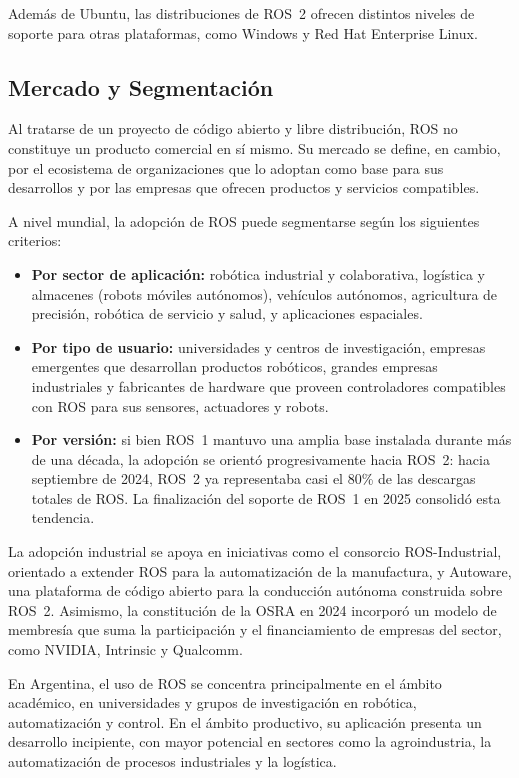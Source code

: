 Además de Ubuntu, las distribuciones de ROS~2 ofrecen distintos niveles de
soporte para otras plataformas, como Windows y Red Hat Enterprise Linux.

\subsection{Mercado y Segmentación}

Al tratarse de un proyecto de código abierto y libre distribución, ROS no
constituye un producto comercial en sí mismo. Su mercado se define, en cambio,
por el ecosistema de organizaciones que lo adoptan como base para sus
desarrollos y por las empresas que ofrecen productos y servicios compatibles.

A nivel mundial, la adopción de ROS puede segmentarse según los siguientes
criterios:
\begin{itemize}
    \item \textbf{Por sector de aplicación:} robótica industrial y
    colaborativa, logística y almacenes (robots móviles autónomos),
    vehículos autónomos, agricultura de precisión, robótica de servicio y
    salud, y aplicaciones espaciales.
    \item \textbf{Por tipo de usuario:} universidades y centros de
    investigación, empresas emergentes que desarrollan productos robóticos,
    grandes empresas industriales y fabricantes de hardware que proveen
    controladores compatibles con ROS para sus sensores, actuadores y robots.
    \item \textbf{Por versión:} si bien ROS~1 mantuvo una amplia base instalada
    durante más de una década, la adopción se orientó progresivamente hacia
    ROS~2: hacia septiembre de 2024, ROS~2 ya representaba casi el 80\% de
    las descargas totales de ROS. La finalización del soporte de ROS~1 en
    2025 consolidó esta tendencia.
\end{itemize}

La adopción industrial se apoya en iniciativas como el consorcio
ROS-Industrial, orientado a extender ROS para la automatización de la
manufactura, y Autoware, una plataforma de código abierto para la conducción
autónoma construida sobre ROS~2. Asimismo, la constitución de la OSRA en 2024 incorporó un modelo de membresía
que suma la participación y el financiamiento de empresas del sector, como
NVIDIA, Intrinsic y Qualcomm.

En Argentina, el uso de ROS se concentra principalmente en el ámbito
académico, en universidades y grupos de investigación en robótica,
automatización y control. En el ámbito productivo, su aplicación presenta un
desarrollo incipiente, con mayor potencial en sectores como la agroindustria,
la automatización de procesos industriales y la logística.

